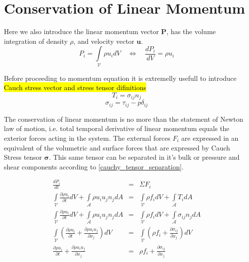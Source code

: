 

\section{Conservation of Linear Momentum}
Here we also introduce the linear momentum vector $\mathbf{P}$, has the volume
integration of density $\rho$, and velocity vector $\mathbf{u}$.
\begin{equation}
P_i=\int\limits_{\mathcal{V}} \rho u_i dV \quad  \Leftrightarrow \quad \frac{dP_i}{dV}= \rho u_i 
\end{equation}

Before proceeding to momentum equation it is extremelly usefull to introduce
\hl{Cauch stress vector and stress tensor difinitions}
\begin{equation}
    \label{cauchy_stress_vector}
    T_i = \sigma_{ij} n_j
\end{equation}
\begin{equation}
    \label{cauchy_tensor_separation}
    \sigma_{ij} = \tau_{ij} - p \delta_{ij}
\end{equation}

The conservation of linear momentum is no more than the statement of Newton law of motion, i.e. total temporal derivative of linear momentum equals the exterior forces acting in the system. The external forces  $F_i$ are expressed in  an equivalent of the volumetric and surface forces that are expressed by Cauch Stress tensor $\boldsymbol \sigma$. This same tensor can be separated in it's bulk or pressure and shear components according to \eqref{cauchy_tensor_separation}.  

\begin{eqnarray}
    \frac{dP_i}{dt} &=& \Sigma F_i \\
    \int\limits_{\mathcal{V}} \frac{\partial \rho u_i}{\partial t} dV + \int\limits_{\mathcal{A}} \rho u_i u_j n_j dA 
    &=& \int\limits_{\mathcal{V}} \rho f_i dV + \int\limits_{\mathcal{A}} T_i dA \\
    \int\limits_{\mathcal{V}} \frac{\partial \rho u_i}{\partial t} dV + \int\limits_{\mathcal{A}} \rho u_i u_j n_j dA   
    &=& \int\limits_{\mathcal{V}} \rho f_i dV + \int\limits_{\mathcal{A}} \sigma_{ij}  n_j dA \\
    \int\limits_{\mathcal{V}} \left( \frac{\partial \rho u_i}{\partial t} + \frac{\partial \rho u_i u_j}{\partial x_j}\right)dV 
    &=& \int\limits_{\mathcal{V}} \left( \rho f_i  + \frac{\partial \sigma_{ij}}{\partial x_j} \right)dV \\
    \frac{\partial \rho u_i}{\partial t} +  \frac{\partial \rho u_i u_j}{\partial x_j} 
    &=& \rho f_i + \frac{\partial \sigma_{ij}}{\partial x_j}
\end{eqnarray}

